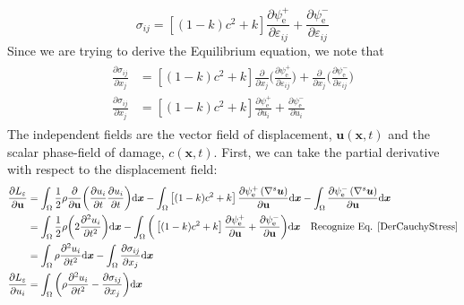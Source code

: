 \documentclass[12pt,3p]{article}
\numberwithin{equation}{section}
\begin{document}
\begin{equation}\label{CauchyStress}
\sigma_{i j}=\left[(1-k) c^{2}+k\right] \frac{\partial \psi_{\mathrm{e}}^{+}}{\partial \varepsilon_{i j}}+\frac{\partial \psi_{\mathrm{e}}^{-}}{\partial \varepsilon_{i j}}
\end{equation}
Since we are trying to derive the Equilibrium equation, we note that 
\begin{align}\label{DerCauchyStress}
\begin{split}
\frac{\partial \sigma_{i j}}{\partial x_j} &= 
\left[(1-k) c^{2}+k\right] \frac{\partial}{\partial x_j} \bigg( \frac{\partial \psi_{\mathrm{e}}^{+}}{\partial \varepsilon_{i j}} \bigg) + \frac{\partial}{\partial x_j} \bigg( \frac{\partial \psi_{\mathrm{e}}^{-}}{\partial \varepsilon_{i j}} \bigg) \\
\frac{\partial \sigma_{i j}}{\partial x_j} &= 
\left[(1-k) c^{2}+k\right] \frac{\partial \psi_{\mathrm{e}}^{+}}{\partial u_i} + \frac{\partial \psi_{\mathrm{e}}^{-}}{\partial u_i}
\end{split}
\end{align}
The independent fields are the vector field of displacement, $\mathbf{u} (\mathbf{x}, t)$ and the scalar phase-field of damage, $c (\mathbf{x}, t)$. First, we can take the partial derivative with respect to the displacement field:
\begin{align*}
\frac{\partial L_{\varepsilon}}{\partial \mathbf{u}} &= 
\int_{\Omega} \frac{1}{2} \rho \frac{\partial}{\partial \mathbf{u}} \bigg( \frac{\partial u_i}{\partial t} \frac{\partial u_i}{\partial t} \bigg) \mathrm{d} \boldsymbol{x} 
- \int_{\Omega} \left[(1-k) c^{2} + k \right] \frac{\partial \psi_{\mathrm{e}}^{+} \left(\nabla^{s} \boldsymbol{u} \right)}{\partial \mathbf{u}} \mathrm{d} \boldsymbol{x} 
- \int_{\Omega} \frac{\partial \psi_{\mathrm{e}}^{-} \left(\nabla^{s} \boldsymbol{u}\right)}{\partial \mathbf{u}} \mathrm{d} \boldsymbol{x} \\
&= \int_{\Omega} \frac{1}{2} \rho \bigg( 2 \frac{\partial^2 u_i}{\partial t^2} \bigg) \mathrm{d} \boldsymbol{x} 
- \int_{\Omega} \bigg( \left[(1-k) c^{2} + k \right] \frac{\partial \psi_{\mathrm{e}}^{+} }{\partial \mathbf{u}} + \frac{\partial \psi_{\mathrm{e}}^{-}}{\partial \mathbf{u}} \bigg) \mathrm{d} \boldsymbol{x}  \quad \text{Recognize Eq. \ref{DerCauchyStress}} \\
&= \int_{\Omega} \rho \frac{\partial^2 u_i}{\partial t^2} \mathrm{d} \boldsymbol{x} 
- \int_{\Omega} \frac{\partial \sigma_{i j}}{\partial x_j} \mathrm{d} \boldsymbol{x} \\
\frac{\partial L_{\varepsilon}}{\partial u_i} &= \int_{\Omega} \bigg( \rho \frac{\partial^2 u_i}{\partial t^2} - \frac{\partial \sigma_{i j}}{\partial x_j} \bigg) \mathrm{d} \boldsymbol{x}
\end{align*}
\end{document}
